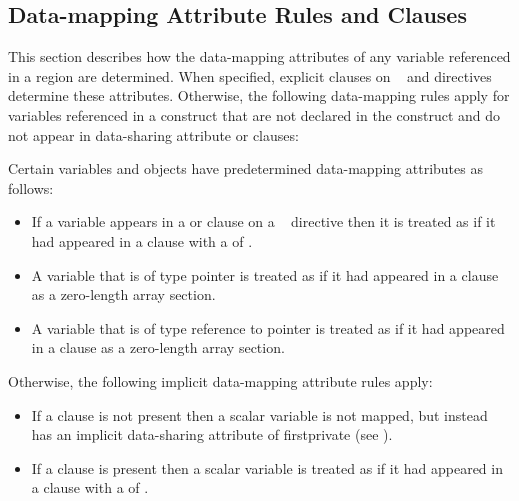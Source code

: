 {{{{%

\subsection{Data-mapping Attribute Rules and Clauses}
\label{subsec:Data-mapping Attribute Rules and Clauses}

This section describes how the data-mapping attributes of any variable 
referenced in a  region are determined. When specified, 
explicit  clauses on ~ and  
directives determine these attributes.  Otherwise, the following 
data-mapping rules apply for variables referenced in a 
construct that are not declared in the construct and do not appear in 
data-sharing attribute or  clauses:

Certain variables and objects have predetermined data-mapping attributes 
as follows:

\begin{itemize}
\item If a variable appears in a  or  clause 
on a ~ directive then it is treated as if it had appeared in a  clause with a  of .

\ccppspecificstart
\item A variable that is of type pointer is treated as if it had appeared in a  clause as a zero-length array section.
\ccppspecificend

\cppspecificstart
\item A variable that is of type reference to pointer is treated as if it had appeared in a  clause as a zero-length array section.
\cppspecificend
\end{itemize}

Otherwise, the following implicit data-mapping attribute rules apply:

\begin{itemize}
\item If a  clause is not present then 
a scalar variable is not mapped, but instead has an implicit data-sharing 
attribute of firstprivate (see 
).

\item If a  clause is present then a scalar 
variable is treated as if it had appeared in a  clause with a 
 of .


\end{itemize}}}}}
